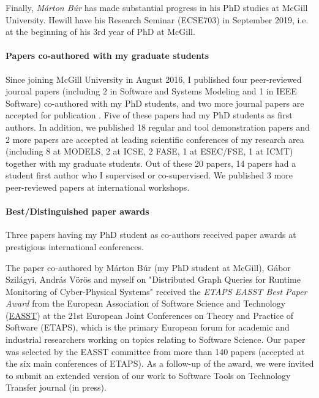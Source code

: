 Finally, \emph{Márton Búr} has made substantial progress in his PhD studies at McGill University. Hewill have his Research Seminar (ECSE703) in September 2019, i.e. at the beginning of his 3rd year of PhD at McGill. 

\paragraph{Papers co-authored with my graduate students}
Since joining McGill University in August 2016, I published four peer-reviewed journal papers \cite{act2017,sosym2017-mondo,sosym2017-tb,ieeesw2018} (including 2 in Software and Systems Modeling and 1 in IEEE Software) co-authored with my PhD students,  and two more journal papers are accepted for publication \cite{sttt-2019-cps,sttt-2019-div}. Five of these papers had my PhD students as first authors. 
In addition, we published 18 regular and tool demonstration papers and 2 more papers are accepted at leading scientific conferences of my research area (including 8 at MODELS, 2 at ICSE, 2 FASE, 1 at ESEC/FSE, 1 at ICMT) together with my graduate students. Out of these 20 papers,  14 papers had a student first author who I supervised or co-supervised. We published 3 more peer-reviewed papers at international workshops.%

\paragraph{Best/Distinguished paper awards}
Three papers having my PhD student as co-authors received paper awards at prestigious international conferences. 

The paper co-authored by Márton Búr (my PhD student at McGill), Gábor Szilágyi, András Vörös and myself on "Distributed Graph Queries for Runtime Monitoring of Cyber-Physical Systems" \cite{fase2018-cps} received the \emph{ETAPS EASST Best Paper Award} from the European Association of Software Science and Technology (\href{http://easst.aulp.co.uk/}{EASST}) at the 21st European Joint Conferences on Theory and Practice of Software (ETAPS), which is the primary European forum for academic and industrial researchers working on topics relating to Software Science. Our paper was selected by the EASST committee from more than 140 papers (accepted at the six main conferences of ETAPS). As a follow-up of the award, we were invited to submit an extended version of our work to Software Tools on Technology Transfer journal \cite{sttt-2019-cps} (in press). 

